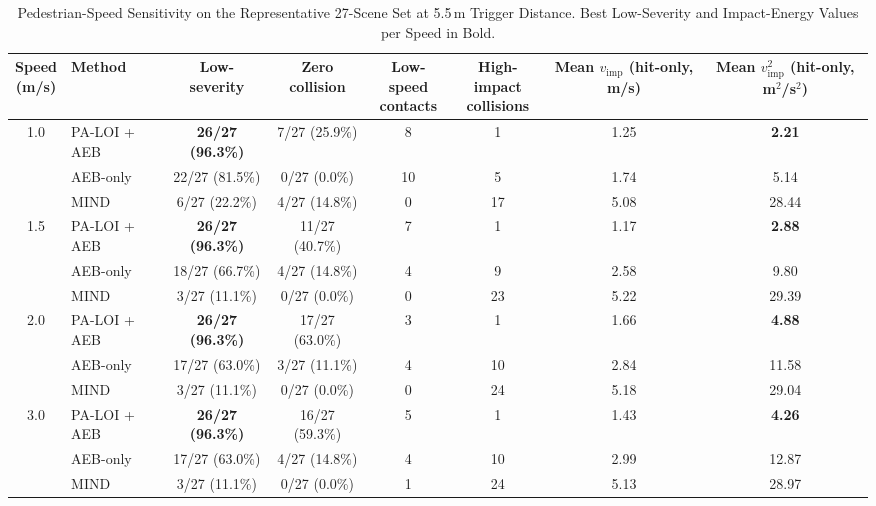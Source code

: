 \begin{table}[t]
\caption{Pedestrian-Speed Sensitivity on the Representative 27-Scene Set at 5.5\,m Trigger Distance. Best Low-Severity and Impact-Energy Values per Speed in Bold.}
\label{tab:speed-sensitivity}
\centering
\scriptsize
\setlength{\tabcolsep}{8pt}
\begin{tabular}{clcccccc}
\toprule
\makecell{Speed\\(m/s)} & Method & Low-severity & Zero collision & \makecell{Low-speed\\contacts} & \makecell{High-impact\\collisions} & \makecell{Mean $v_{\mathrm{imp}}$\\(hit-only, m/s)} & \makecell{Mean $v_{\mathrm{imp}}^2$\\(hit-only, m$^2$/s$^2$)} \\
\midrule
\multirow{3}{*}{1.0} & PA-LOI + AEB & \textbf{26/27 (96.3\%)} & 7/27 (25.9\%) & 8 & 1 & 1.25 & \textbf{2.21} \\
 & AEB-only & 22/27 (81.5\%) & 0/27 (0.0\%) & 10 & 5 & 1.74 & 5.14 \\
 & MIND & 6/27 (22.2\%) & 4/27 (14.8\%) & 0 & 17 & 5.08 & 28.44 \\
\midrule
\multirow{3}{*}{1.5} & PA-LOI + AEB & \textbf{26/27 (96.3\%)} & 11/27 (40.7\%) & 7 & 1 & 1.17 & \textbf{2.88} \\
 & AEB-only & 18/27 (66.7\%) & 4/27 (14.8\%) & 4 & 9 & 2.58 & 9.80 \\
 & MIND & 3/27 (11.1\%) & 0/27 (0.0\%) & 0 & 23 & 5.22 & 29.39 \\
\midrule
\multirow{3}{*}{2.0} & PA-LOI + AEB & \textbf{26/27 (96.3\%)} & 17/27 (63.0\%) & 3 & 1 & 1.66 & \textbf{4.88} \\
 & AEB-only & 17/27 (63.0\%) & 3/27 (11.1\%) & 4 & 10 & 2.84 & 11.58 \\
 & MIND & 3/27 (11.1\%) & 0/27 (0.0\%) & 0 & 24 & 5.18 & 29.04 \\
\midrule
\multirow{3}{*}{3.0} & PA-LOI + AEB & \textbf{26/27 (96.3\%)} & 16/27 (59.3\%) & 5 & 1 & 1.43 & \textbf{4.26} \\
 & AEB-only & 17/27 (63.0\%) & 4/27 (14.8\%) & 4 & 10 & 2.99 & 12.87 \\
 & MIND & 3/27 (11.1\%) & 0/27 (0.0\%) & 1 & 24 & 5.13 & 28.97 \\
\bottomrule
\end{tabular}
\end{table}
